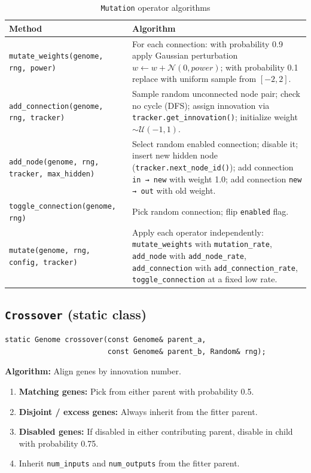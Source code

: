 \begin{table}[H]
\centering\small
\caption{\texttt{Mutation} operator algorithms}
\begin{tabularx}{\textwidth}{@{}lX@{}}
\toprule
\textbf{Method} & \textbf{Algorithm} \\
\midrule
\texttt{mutate\_weights(genome, rng, power)} &
  For each connection: with probability 0.9 apply Gaussian perturbation
  $w \leftarrow w + \mathcal{N}(0, \mathit{power})$; with probability 0.1 replace
  with uniform sample from $[-2, 2]$. \\
\texttt{add\_connection(genome, rng, tracker)} &
  Sample random unconnected node pair; check no cycle (DFS); assign innovation via
  \texttt{tracker.get\_innovation()}; initialize weight $\sim \mathcal{U}(-1,1)$. \\
\texttt{add\_node(genome, rng, tracker, max\_hidden)} &
  Select random enabled connection; disable it; insert new hidden node
  (\texttt{tracker.next\_node\_id()}); add connection \texttt{in → new} with weight 1.0;
  add connection \texttt{new → out} with old weight. \\
\texttt{toggle\_connection(genome, rng)} &
  Pick random connection; flip \texttt{enabled} flag. \\
\texttt{mutate(genome, rng, config, tracker)} &
  Apply each operator independently: \texttt{mutate\_weights} with
  \texttt{mutation\_rate}, \texttt{add\_node} with \texttt{add\_node\_rate},
  \texttt{add\_connection} with \texttt{add\_connection\_rate},
  \texttt{toggle\_connection} at a fixed low rate. \\
\bottomrule
\end{tabularx}
\end{table}

\subsection{\texttt{Crossover} (static class)}

\begin{lstlisting}
static Genome crossover(const Genome& parent_a,
                        const Genome& parent_b, Random& rng);
\end{lstlisting}

\textbf{Algorithm:} Align genes by innovation number.
\begin{enumerate}[nosep]
  \item \textbf{Matching genes:} Pick from either parent with probability 0.5.
  \item \textbf{Disjoint / excess genes:} Always inherit from the fitter parent.
  \item \textbf{Disabled genes:} If disabled in either contributing parent, disable
    in child with probability 0.75.
  \item Inherit \texttt{num\_inputs} and \texttt{num\_outputs} from the fitter parent.
\end{enumerate}

